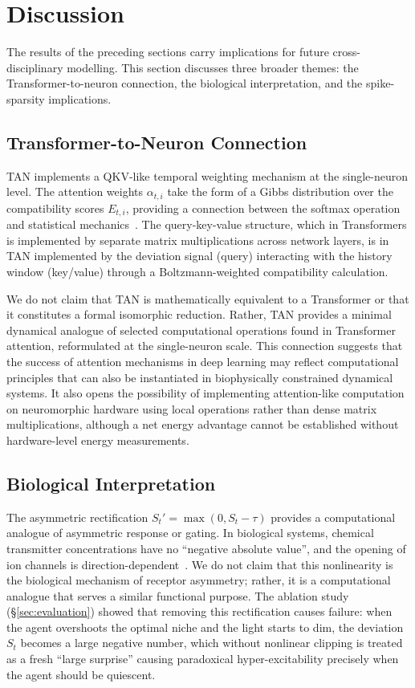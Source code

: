 \section{Discussion}\label{sec:discussion}

The results of the preceding sections carry implications for future cross-disciplinary modelling. This section discusses three broader themes: the Transformer-to-neuron connection, the biological interpretation, and the spike-sparsity implications.

\subsection{Transformer-to-Neuron Connection}

TAN implements a QKV-like temporal weighting mechanism at the single-neuron level. The attention weights $\alpha_{t,i}$ take the form of a Gibbs distribution over the compatibility scores $E_{t,i}$, providing a connection between the softmax operation and statistical mechanics~\cite{jaynes1957,boltzmann1868,gibbs1902,bahri2020}. The query-key-value structure, which in Transformers is implemented by separate matrix multiplications across network layers, is in TAN implemented by the deviation signal (query) interacting with the history window (key/value) through a Boltzmann-weighted compatibility calculation.

We do not claim that TAN is mathematically equivalent to a Transformer or that it constitutes a formal isomorphic reduction. Rather, TAN provides a minimal dynamical analogue of selected computational operations found in Transformer attention, reformulated at the single-neuron scale. This connection suggests that the success of attention mechanisms in deep learning may reflect computational principles that can also be instantiated in biophysically constrained dynamical systems. It also opens the possibility of implementing attention-like computation on neuromorphic hardware using local operations rather than dense matrix multiplications, although a net energy advantage cannot be established without hardware-level energy measurements.

\subsection{Biological Interpretation}

The asymmetric rectification $S_t' = \max(0, S_t - \tau)$ provides a computational analogue of asymmetric response or gating. In biological systems, chemical transmitter concentrations have no ``negative absolute value'', and the opening of ion channels is direction-dependent~\cite{kandel2000}. We do not claim that this nonlinearity is the biological mechanism of receptor asymmetry; rather, it is a computational analogue that serves a similar functional purpose. The ablation study (\S\ref{sec:evaluation}) showed that removing this rectification causes failure: when the agent overshoots the optimal niche and the light starts to dim, the deviation $S_t$ becomes a large negative number, which without nonlinear clipping is treated as a fresh ``large surprise'' causing paradoxical hyper-excitability precisely when the agent should be quiescent.

